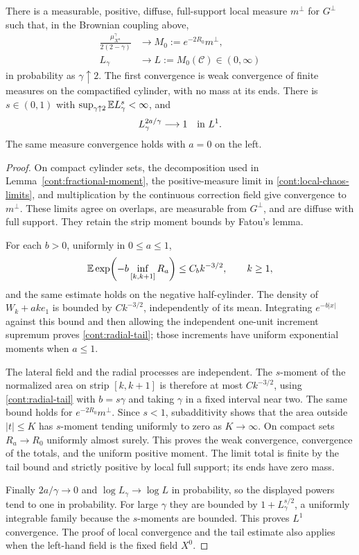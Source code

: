 \begin{lemma}\label{cont:cylinder-limit}
There is a measurable, positive, diffuse, full-support local measure
$m^\perp$ for $G^\perp$ such that, in the Brownian coupling above,
\begin{align*}
 \frac{\mu_{X^a}^\gamma}{2(2-\gamma)}
       &\longrightarrow M_0:=e^{-2R_0}m^\perp,\\
 L_\gamma&\longrightarrow L:=M_0(\mathcal C)\in(0,\infty)
\end{align*}
in probability as $\gamma\uparrow2$.  The first convergence is weak convergence
of finite measures on the compactified cylinder, with no mass at its ends.
There is $s\in(0,1)$ with $\sup_{\gamma\uparrow2}\mathbb E L_\gamma^s<\infty$, and
\[
 L_\gamma^{2a/\gamma}\longrightarrow1\quad\hbox{in }L^1.
\]
The same measure convergence holds with $a=0$ on the left.
\end{lemma}

\begin{proof}
On compact cylinder sets, the decomposition used in
Lemma~\ref{cont:fractional-moment}, the positive-measure limit in
\eqref{cont:local-chaos-limits}, and multiplication by the continuous
correction field give convergence to $m^\perp$.  These limits agree on
overlaps, are measurable from $G^\perp$, and are diffuse with full support.
They retain the strip moment bounds by Fatou's lemma.

For each $b>0$, uniformly in $0\leq a\leq1$,
\begin{equation}\label{cont:radial-tail}
 \mathbb E\exp\!\left(-b\inf_{[k,k+1]}R_a\right)
       \leq C_b k^{-3/2},\qquad k\geq1,
\end{equation}
and the same estimate holds on the negative half-cylinder.  The density of
$W_k+ak e_1$ is bounded by $Ck^{-3/2}$, independently of its mean.  Integrating
$e^{-b|x|}$ against this bound and then allowing the independent one-unit
increment supremum proves \eqref{cont:radial-tail}; those increments have
uniform exponential moments when $a\leq1$.

The lateral field and the radial processes are independent.  The
$s$-moment of the normalized area on strip $[k,k+1]$ is therefore at most
$Ck^{-3/2}$, using \eqref{cont:radial-tail} with $b=s\gamma$ and taking
$\gamma$ in a fixed interval near two.  The same bound holds for
$e^{-2R_0}m^\perp$.  Since $s<1$, subadditivity shows that the area outside
$|t|\leq K$ has $s$-moment tending uniformly to zero as $K\to\infty$.
On compact sets $R_a\to R_0$ uniformly almost surely.  This proves the weak
convergence, convergence of the totals, and the uniform positive moment.
The limit total is finite by the tail bound and strictly positive by local
full support; its ends have zero mass.

Finally $2a/\gamma\to0$ and $\log L_\gamma\to\log L$ in probability, so the
displayed powers tend to one in probability.  For large $\gamma$ they are
bounded by $1+L_\gamma^{s/2}$, a uniformly integrable family because the
$s$-moments are bounded.  This proves $L^1$ convergence.  The proof of local
convergence and the tail estimate also applies when the left-hand field is
the fixed field $X^0$.
\end{proof}

